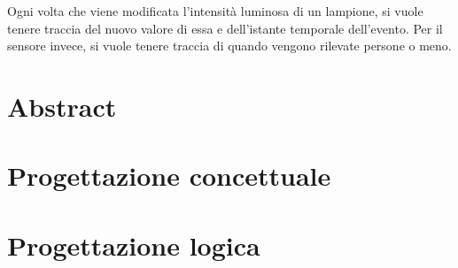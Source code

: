 Ogni volta che viene modificata l'intensità luminosa di un lampione, si vuole tenere traccia del nuovo valore di essa e dell'istante temporale dell'evento.
Per il sensore invece, si vuole tenere traccia di quando vengono rilevate persone o meno.

\section{Abstract}

\section{Progettazione concettuale}

\section{Progettazione logica}